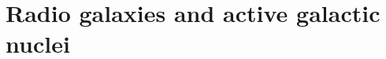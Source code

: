 \documentclass[11pt, a4paper]{book}
\begin{document}

\section{Radio galaxies and active galactic nuclei}
\label{sec:agn}
\end{document}

